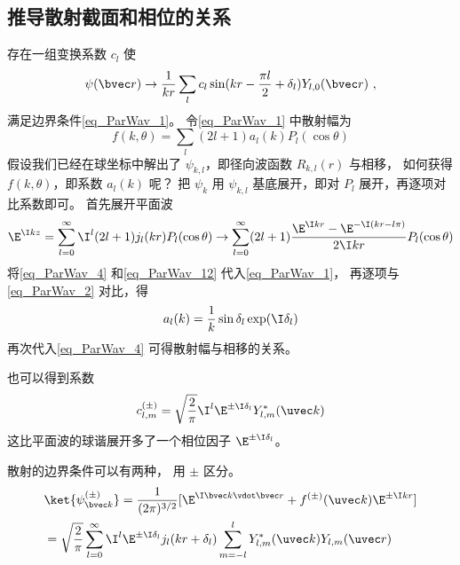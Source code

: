 \subsection{推导散射截面和相位的关系}
存在一组变换系数 $c_l$ 使
\begin{equation}\label{eq_ParWav_2}
\psi(\bvec r) \rightarrow \frac{1}{kr} \sum_l c_l \sin(kr - \frac{\pi l}{2} + \delta_l) Y_{l,0}(\bvec r)~,
\end{equation}
满足边界条件\autoref{eq_ParWav_1}。 令\autoref{eq_ParWav_1} 中散射幅为
\begin{equation}\label{eq_ParWav_4}
f(k,\theta) = \sum_l (2l + 1) a_l(k) P_l(\cos \theta)
\end{equation}
假设我们已经在球坐标中解出了 $\psi_{k,l}$，即径向波函数 $R_{k,l}(r)$ 与相移， 如何获得 $f(k,\theta )$，即系数 $a_l(k)$ 呢？ 把 $\psi_k$ 用 $\psi_{k,l}$ 基底展开，即对 $P_l$ 展开，再逐项对比系数即可。 首先展开平面波
\begin{equation}\label{eq_ParWav_12}
\E^{\I kz} = \sum_{l = 0}^\infty  \I^l (2l + 1) j_l(kr) P_l(\cos \theta) \rightarrow \sum_{l=0}^\infty  (2l + 1)\frac{\E^{\I kr} - \E^{-\I(kr - l\pi)}}{2\I kr} P_l(\cos \theta)
\end{equation}
将\autoref{eq_ParWav_4} 和\autoref{eq_ParWav_12} 代入\autoref{eq_ParWav_1}， 再逐项与\autoref{eq_ParWav_2} 对比，得
\begin{equation}
a_l(k) = \frac{1}{k} \sin\delta_l \exp(\I \delta_l)
\end{equation}
再次代入\autoref{eq_ParWav_4} 可得散射幅与相移的关系。

也可以得到系数
\begin{equation}
c_{l,m}^{(\pm)} = \sqrt{\frac{2}{\pi}} \I^l \E^{\pm \I \delta_l} Y_{l,m}^*(\uvec k)
\end{equation}
这比平面波的球谐展开多了一个相位因子 $\E^{\pm \I \delta_l}$。

散射的边界条件可以有两种， 用 $\pm$ 区分。
\begin{equation}
\begin{aligned}
&\ket{\psi_{\bvec k}^{(\pm)}} = \frac{1}{(2\pi)^{3/2}}[\E^{\I \bvec k \vdot \bvec r} + f^{(\pm)}(\uvec k)\E^{\pm\I kr}]\\
&= \sqrt{\frac{2}{\pi}} \sum_{l=0}^{\infty} \I^l \E^{\pm\I \delta_l} j_l(kr + \delta_l) \sum_{m=-l}^l Y_{l,m}^*(\uvec k) Y_{l,m}(\uvec r)
\end{aligned}
\end{equation}
